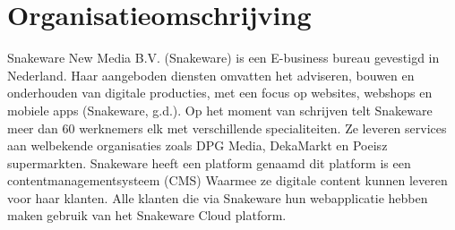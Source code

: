 \section{Organisatieomschrijving}
Snakeware New Media B.V. (Snakeware) is een E-business bureau gevestigd in Nederland. Haar
aangeboden diensten omvatten het adviseren, bouwen en onderhouden van digitale producties, met
een focus op websites, webshops en mobiele apps (Snakeware, g.d.). Op het moment van schrijven
telt Snakeware meer dan 60 werknemers elk met verschillende specialiteiten. Ze leveren services
aan welbekende organisaties zoals DPG Media, DekaMarkt en Poeisz supermarkten.
\whitespace
Snakeware heeft een platform genaamd  dit platform is een contentmanagementsysteem
(CMS) Waarmee ze digitale content kunnen leveren voor haar klanten.
Alle klanten die via Snakeware hun webapplicatie hebben maken gebruik van het Snakeware Cloud platform.
\whitespace
{}

